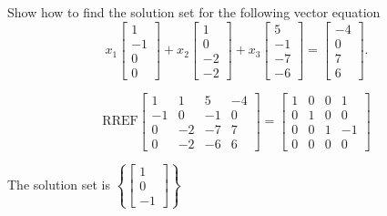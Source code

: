 
\begin{exerciseStatement}


Show how to find the solution set for the following vector equation \[ x_{1} \left[\begin{array}{c}
1 \\
-1 \\
0 \\
0
\end{array}\right] + x_{2} \left[\begin{array}{c}
1 \\
0 \\
-2 \\
-2
\end{array}\right] + x_{3} \left[\begin{array}{c}
5 \\
-1 \\
-7 \\
-6
\end{array}\right] = \left[\begin{array}{c}
-4 \\
0 \\
7 \\
6
\end{array}\right] .\]


\end{exerciseStatement}
    
\begin{exerciseAnswer} 
\[\mathrm{RREF} \left[\begin{array}{ccc|c}
1 & 1 & 5 & -4 \\
-1 & 0 & -1 & 0 \\
0 & -2 & -7 & 7 \\
0 & -2 & -6 & 6
\end{array}\right]  =  \left[\begin{array}{ccc|c}
1 & 0 & 0 & 1 \\
0 & 1 & 0 & 0 \\
0 & 0 & 1 & -1 \\
0 & 0 & 0 & 0
\end{array}\right] \]

The solution set is \( \left\{ \left[\begin{array}{c}
1 \\
0 \\
-1
\end{array}\right] \right\} \)


\end{exerciseAnswer}
    

